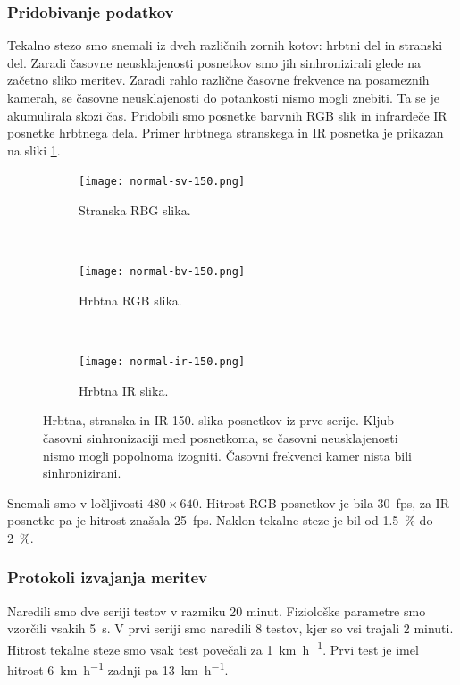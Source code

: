 \subsubsection{Pridobivanje podatkov}
Tekalno stezo smo snemali iz dveh različnih zornih kotov: hrbtni del in stranski del. Zaradi časovne neusklajenosti posnetkov smo jih sinhronizirali glede na začetno sliko meritev. Zaradi rahlo različne časovne frekvence na posameznih kamerah, se časovne neusklajenosti do potankosti nismo mogli znebiti. Ta se je akumulirala skozi čas. Pridobili smo posnetke barvnih RGB slik in infrardeče IR posnetke hrbtnega dela. Primer hrbtnega stranskega  in IR posnetka je prikazan na sliki \ref{fig:primer-posnetka-rgb-ir}.

\begin{figure}[htb]
	\centering
	\begin{subfigure}[t]{0.3\columnwidth}
		\centering
		\texttt{[image: normal-sv-150.png]}
		\caption{Stranska RBG slika.}
	\end{subfigure}
	~
	\begin{subfigure}[t]{0.3\columnwidth}
		\centering
		\texttt{[image: normal-bv-150.png]}
		\caption{Hrbtna RGB slika.}
	\end{subfigure}
	~
    \begin{subfigure}[t]{0.3\columnwidth}
    	\centering
		\texttt{[image: normal-ir-150.png]}
		\caption{Hrbtna IR slika.}
	\end{subfigure}
	\caption[Hrbtna, stranska in IR 150. slika posnetkov iz prve serije]{Hrbtna, stranska in IR 150. slika posnetkov iz prve serije. Kljub časovni sinhronizaciji med posnetkoma, se časovni neusklajenosti nismo mogli popolnoma izogniti. Časovni frekvenci kamer nista bili sinhronizirani.}
	\label{fig:primer-posnetka-rgb-ir}
\end{figure}

Snemali smo v ločljivosti $480 \times 640$. Hitrost RGB posnetkov je bila \SI{30}{fps}, za IR posnetke pa je hitrost znašala \SI{25}{fps}.  Naklon tekalne steze je bil od \SI{1.5}{\%} do \SI{2}{\%}.



\subsubsection{Protokoli izvajanja meritev}
Naredili smo dve seriji testov v razmiku 20 minut. Fiziološke parametre smo vzorčili vsakih \SI{5}{\s}. V prvi seriji smo naredili 8 testov, kjer so vsi trajali 2 minuti. Hitrost tekalne steze smo vsak test povečali za \SI{1}{\km\per\hour}. Prvi test je imel hitrost  \SI{6}{\km\per\hour} zadnji pa \SI{13}{\km\per\hour}.

